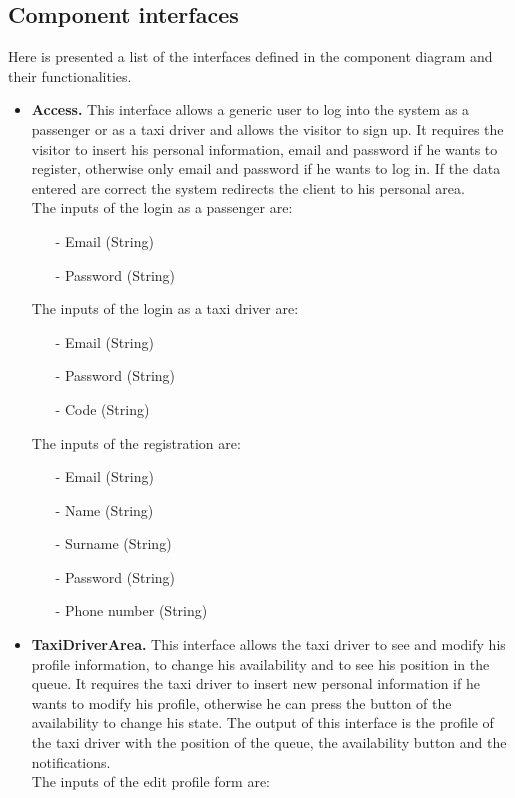 \newpage
\subsection{Component interfaces}
Here is presented a list of the interfaces defined in the component diagram and their functionalities.
\begin{itemize}
	\item \textbf{Access.}
		This interface allows a generic user to log into the system as a passenger or as a taxi driver and allows the visitor to sign up. It requires the visitor to insert his personal information, email and password if he wants to register, otherwise only email and password if he wants to log in. If the data entered are correct the system redirects the client to his personal area.\\ The inputs of the login as a passenger are:
		\begin{itemize} 
			\item[-] Email (String)
			\item[-] Password (String)
		\end{itemize}
		The inputs of the login as a taxi driver are:
		\begin{itemize} 
			\item[-] Email (String)
			\item[-] Password (String)
			\item[-] Code (String)
		\end{itemize} 
		The inputs of the registration are:
		\begin{itemize} 
			\item[-] Email (String)
			\item[-] Name (String)
			\item[-] Surname (String)
			\item[-] Password (String)
			\item[-] Phone number (String)
		\end{itemize}
	\item \textbf{TaxiDriverArea.}
		This interface allows the taxi driver to see and modify his profile information, to change his availability and to see his position in the queue. It requires the taxi driver to insert new personal information if he wants to modify his profile, otherwise he can press the button of the availability to change his state. The output of this interface is the profile of the taxi driver with the position of the queue, the availability button and the notifications.\\ The inputs of the edit profile form are:

\end{itemize}
